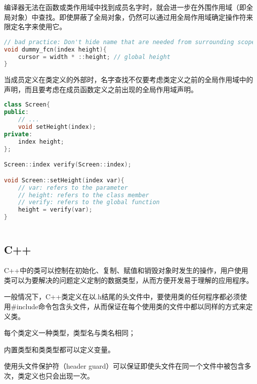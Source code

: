 编译器无法在函数或类作用域中找到成员名字时，就会进一步在外围作用域（即全局对象）中查找。即使屏蔽了全局对象，仍然可以通过用全局作用域确定操作符来限定名字来使用它。

\begin{lstlisting}[language=C++]
// bad practice: Don't hide name that are needed from surrounding scopes
void dummy_fcn(index height){
	cursor = width * ::height; // global height
}
\end{lstlisting}

当成员定义在类定义的外部时，名字查找不仅要考虑类定义之前的全局作用域中的声明，而且要考虑在成员函数定义之前出现的全局作用域声明。




\begin{lstlisting}[language=C++]
class Screen{
public:
	// ...
	void setHeight(index);
private:
	index height;
};

Screen::index verify(Screen::index);

void Screen::setHeight(index var){
	// var: refers to the parameter
	// height: refers to the class member
	// verify: refers to the global function
	height = verify(var);
}
\end{lstlisting}





\begin{lstlisting}[language=C++]

\end{lstlisting}



\subsection{C++}

C++中的类可以控制在初始化、复制、赋值和销毁对象时发生的操作，用户使用类可以为要解决的问题定义定制的数据类型，从而方便开发易于理解的应用程序。

一般情况下，C++类定义在以.h结尾的头文件中，要使用类的任何程序都必须使用\#include命令包含头文件，从而保证在每个使用类的文件中都以同样的方式来定义类。

\begin{compactitem}
\item 每个类定义一种类型，类型名与类名相同；
\item 内置类型和类类型都可以定义变量。
\end{compactitem}

使用头文件保护符（header guard）可以保证即使头文件在同一个文件中被包含多次，类定义也只会出现一次。


